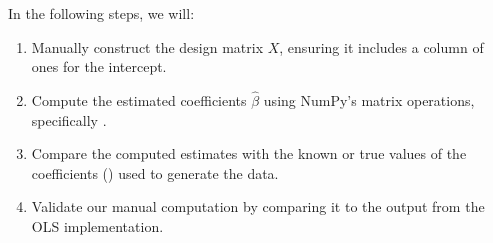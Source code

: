 \documentclass[letterpaper,10pt,english]{jupyterBook}
\begin{document}
\sphinxAtStartPar
In the following steps, we will:
\begin{enumerate}
%
\item {} 
\sphinxAtStartPar
Manually construct the design matrix \(X\), ensuring it includes a column of ones for the intercept.

\item {} 
\sphinxAtStartPar
Compute the estimated coefficients \(\hat{\beta}\) using NumPy’s matrix operations, specifically .

\item {} 
\sphinxAtStartPar
Compare the computed estimates with the known or true values of the coefficients () used to generate the data.

\item {} 
\sphinxAtStartPar
Validate our manual computation by comparing it to the output from the  OLS implementation.

\end{enumerate}
\end{document}

